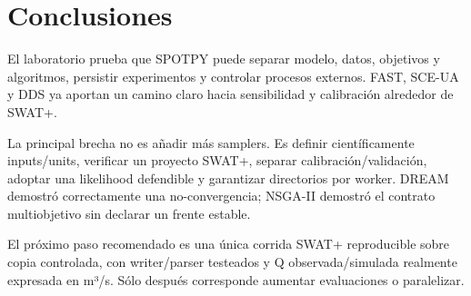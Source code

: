 \chapter{Conclusiones}
El laboratorio prueba que SPOTPY puede separar modelo, datos, objetivos y algoritmos, persistir experimentos y controlar procesos externos. FAST, SCE-UA y DDS ya aportan un camino claro hacia sensibilidad y calibración alrededor de SWAT+.

La principal brecha no es añadir más samplers. Es definir científicamente inputs/units, verificar un proyecto SWAT+, separar calibración/validación, adoptar una likelihood defendible y garantizar directorios por worker. DREAM demostró correctamente una no-convergencia; NSGA-II demostró el contrato multiobjetivo sin declarar un frente estable.

El próximo paso recomendado es una única corrida SWAT+ reproducible sobre copia controlada, con writer/parser testeados y Q observada/simulada realmente expresada en m³/s. Sólo después corresponde aumentar evaluaciones o paralelizar.

